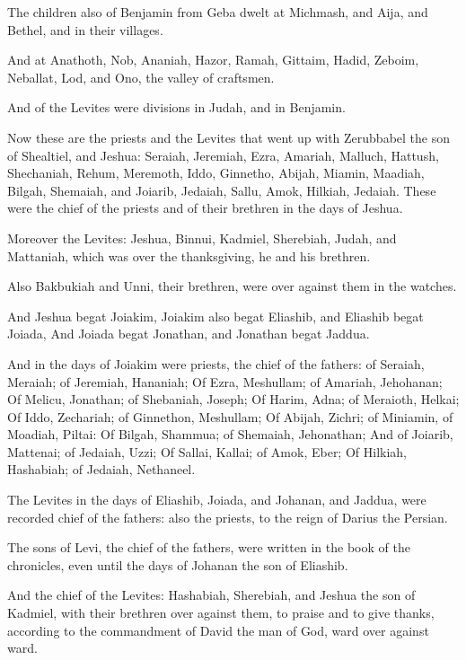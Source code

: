 \Verse The children also of Benjamin from Geba dwelt at Michmash, and Aija, and Bethel, and in their villages.

\Verse And at Anathoth, Nob, Ananiah, \Verse Hazor, Ramah, Gittaim, \Verse Hadid, Zeboim, Neballat, \Verse Lod, and Ono, the valley of craftsmen.

\Verse And of the Levites were divisions in Judah, and in Benjamin.


\Chapter
\Verse Now these are the priests and the Levites that went up with Zerubbabel the son of Shealtiel, and Jeshua: Seraiah, Jeremiah, Ezra, \Verse Amariah, Malluch, Hattush, \Verse Shechaniah, Rehum, Meremoth, \Verse Iddo, Ginnetho, Abijah, \Verse Miamin, Maadiah, Bilgah, \Verse Shemaiah, and Joiarib, Jedaiah, \Verse Sallu, Amok, Hilkiah, Jedaiah. These were the chief of the priests and of their brethren in the days of Jeshua.

\Verse Moreover the Levites: Jeshua, Binnui, Kadmiel, Sherebiah, Judah, and Mattaniah, which was over the thanksgiving, he and his brethren.

\Verse Also Bakbukiah and Unni, their brethren, were over against them in the watches.

\Verse And Jeshua begat Joiakim, Joiakim also begat Eliashib, and Eliashib begat Joiada, \Verse And Joiada begat Jonathan, and Jonathan begat Jaddua.

\Verse And in the days of Joiakim were priests, the chief of the fathers: of Seraiah, Meraiah; of Jeremiah, Hananiah; \Verse Of Ezra, Meshullam; of Amariah, Jehohanan; \Verse Of Melicu, Jonathan; of Shebaniah, Joseph; \Verse Of Harim, Adna; of Meraioth, Helkai; \Verse Of Iddo, Zechariah; of Ginnethon, Meshullam; \Verse Of Abijah, Zichri; of Miniamin, of Moadiah, Piltai: \Verse Of Bilgah, Shammua; of Shemaiah, Jehonathan; \Verse And of Joiarib, Mattenai; of Jedaiah, Uzzi; \Verse Of Sallai, Kallai; of Amok, Eber; \Verse Of Hilkiah, Hashabiah; of Jedaiah, Nethaneel.

\Verse The Levites in the days of Eliashib, Joiada, and Johanan, and Jaddua, were recorded chief of the fathers: also the priests, to the reign of Darius the Persian.

\Verse The sons of Levi, the chief of the fathers, were written in the book of the chronicles, even until the days of Johanan the son of Eliashib.

\Verse And the chief of the Levites: Hashabiah, Sherebiah, and Jeshua the son of Kadmiel, with their brethren over against them, to praise and to give thanks, according to the commandment of David the man of God, ward over against ward.

